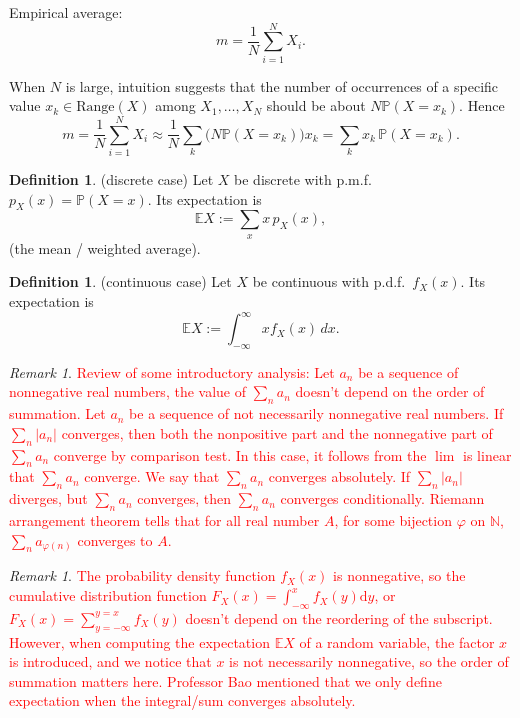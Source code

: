 \documentclass[11pt]{article}
\theoremstyle{plain}
\theoremstyle{definition}
\newtheorem{definition}[theorem]{Definition}
\theoremstyle{remark}
\newtheorem{remark}[theorem]{Remark}
\begin{document}
	Empirical average:
	\[
	m=\frac{1}{N}\sum_{i=1}^{N}X_i.
	\]
	
	When \(N\) is large, intuition suggests that the number of occurrences of a specific value
	\(x_k \in \mathrm{Range}(X)\) among \(X_1,\dots,X_N\) should be about
	\(N\mathbb{P}(X=x_k)\). Hence
	\[
	m=\frac{1}{N}\sum_{i=1}^{N}X_i
	\approx \frac{1}{N}\sum_{k}\bigl(N\mathbb{P}(X=x_k)\bigr)x_k
	=\sum_k x_k\,\mathbb{P}(X=x_k).
	\]
	
	\begin{definition}
		(discrete case) Let \(X\) be discrete with p.m.f.\ \(p_X(x)=\mathbb{P}(X=x)\).
		Its expectation is
		\[
		\mathbb{E}X := \sum_x x\,p_X(x),
		\]
		(the mean / weighted average).
	\end{definition}
	
	\begin{definition}
		(continuous case) Let \(X\) be continuous with p.d.f.\ \(f_X(x)\).
		Its expectation is
		\[
		\mathbb{E}X := \int_{-\infty}^{\infty} x f_X(x)\,dx.
		\]
	\end{definition}
	
	\begin{remark}
		\textcolor{red}{Review of some introductory analysis: Let $a_n$ be a sequence of nonnegative real numbers, the value of $\sum_na_n$ doesn't depend on the order of summation. Let $a_n$ be a sequence of not necessarily nonnegative real numbers. If $\sum_n|a_n|$ converges, then both the nonpositive part and the nonnegative part of $\sum_na_n$ converge by comparison test. In this case, it follows from the $\lim$ is linear that $\sum_na_n$ converge. We say that $\sum_na_n$ converges absolutely. If $\sum_n|a_n|$ diverges, but $\sum_na_n$ converges, then $\sum_na_n$ converges conditionally. Riemann arrangement theorem tells that for all real number $A$, for some bijection $\varphi$ on $\mathbb{N}$, $\sum_na_{\varphi(n)}$ converges to $A$.}
	\end{remark}
	
	\begin{remark}
		\textcolor{red}{The probability density function $f_X(x)$ is nonnegative, so the cumulative distribution function $F_X(x)=\int_{-\infty}^xf_X(y)\mathrm{d}y$, or $F_X(x)=\sum_{y=-\infty}^{y=x}f_X(y)$ doesn't depend on the reordering of the subscript. However, when computing the expectation $\mathbb{E}X$ of a random variable, the factor $x$ is introduced, and we notice that $x$ is not necessarily nonnegative, so the order of summation matters here. Professor Bao mentioned that we only define expectation when the integral/sum converges absolutely.}
	\end{remark}
	
\end{document}
